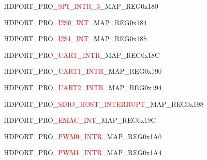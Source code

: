 \vspace{-3em}
\begin{register}{H}{DPORT\_PRO\_\textcolor{red}{SPI\_INTR\_3}\_MAP\_REG}{0x180}\label{regdesc:PROSPIINTR3MAPREG}
\end{register}
\vspace{-3em}
\begin{register}{H}{DPORT\_PRO\_\textcolor{red}{I2S0\_INT}\_MAP\_REG}{0x184}\label{regdesc:PROI2S0INTMAPREG}
\end{register}
\vspace{-3em}
\begin{register}{H}{DPORT\_PRO\_\textcolor{red}{I2S1\_INT}\_MAP\_REG}{0x188}\label{regdesc:PROI2S1INTMAPREG}
\end{register}
\vspace{-3em}
\begin{register}{H}{DPORT\_PRO\_\textcolor{red}{UART\_INTR}\_MAP\_REG}{0x18C}\label{regdesc:PROUARTINTRMAPREG}
\end{register}
\vspace{-3em}
\begin{register}{H}{DPORT\_PRO\_\textcolor{red}{UART1\_INTR}\_MAP\_REG}{0x190}\label{regdesc:PROUART1INTRMAPREG}
\end{register}
\vspace{-3em}
\begin{register}{H}{DPORT\_PRO\_\textcolor{red}{UART2\_INTR}\_MAP\_REG}{0x194}\label{regdesc:PROUART2INTRMAPREG}
\end{register}
\vspace{-3em}
\begin{register}{H}{DPORT\_PRO\_\textcolor{red}{SDIO\_HOST\_INTERRUPT}\_MAP\_REG}{0x198}\label{regdesc:PROSDIOHOSTINTERRUPTMAPREG}
\end{register}
\vspace{-3em}
\begin{register}{H}{DPORT\_PRO\_\textcolor{red}{EMAC\_INT}\_MAP\_REG}{0x19C}\label{regdesc:PROEMACINTMAPREG}
\end{register}
\vspace{-3em}
\begin{register}{H}{DPORT\_PRO\_\textcolor{red}{PWM0\_INTR}\_MAP\_REG}{0x1A0}\label{regdesc:PROPWM0INTRMAPREG}
\end{register}
\vspace{-3em}
\begin{register}{H}{DPORT\_PRO\_\textcolor{red}{PWM1\_INTR}\_MAP\_REG}{0x1A4}\label{regdesc:PROPWM1INTRMAPREG}
\end{register}
